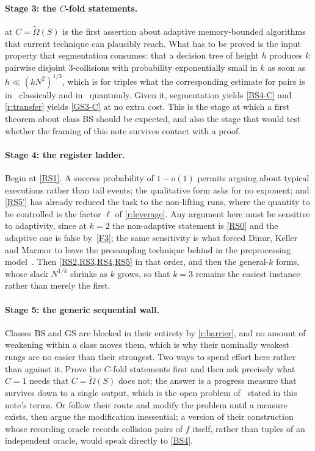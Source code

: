 \documentclass[11pt]{article}
\theoremstyle{plain}
\theoremstyle{definition}
\newcommand{\cls}[1]{\textsf{#1}}   %
\begin{document}
\paragraph{Stage 3: the $C$-fold statements.}
 at $C = \tilde\Omega(S)$ is the first assertion about
adaptive memory-bounded algorithms that current technique can plausibly
reach.  What has to be proved is the input property that segmentation
consumes: that a decision tree of height $h$ produces $k$ pairwise disjoint
$3$-collisions with probability exponentially small in $k$ as soon as
$h \ll (kN^{2})^{1/3}$, which is for triples what the corresponding
estimate for pairs is in~\cite{Din20} classically and in~\cite{HM21}
quantumly.  Given it, segmentation yields
\cref{BS4-C} and \cref{r:transfer} yields \cref{GS3-C} at no extra cost.
This is the stage at which a first theorem about class \cls{BS} should be
expected, and also the stage that would test whether the framing of this
note survives contact with a proof.

\paragraph{Stage 4: the register ladder.}
Begin at \cref{RS1}.  A success probability of $1-o(1)$ permits arguing
about typical executions rather than tail events; the qualitative form asks
for no exponent; and \cref{RS5'} has already reduced the task to the
non-lifting runs, where the quantity to be controlled is the factor $\ell$
of \cref{r:leverage}.  Any argument here must be sensitive to adaptivity,
since at $k=2$ the non-adaptive statement is \cref{RS0} and the adaptive one
is false by~\ref{F3}; the same sensitivity is what forced Dinur, Keller and
Marmor to leave the presampling technique behind in the preprocessing
model~\cite{DKM25}.  Then \cref{RS2,RS3,RS4,RS5} in that order, and then
the general-$k$ forms, whose slack $N^{1/k}$ shrinks as $k$ grows, so that
$k=3$ remains the easiest instance rather than merely the first.

\paragraph{Stage 5: the generic sequential wall.}
Classes \cls{BS} and \cls{GS} are blocked in their entirety by
\cref{r:barrier}, and no amount of weakening within a class moves them,
which is why their nominally weakest rungs are no easier than their
strongest.  Two ways to spend effort here rather than against it.  Prove the
$C$-fold statements first and then ask precisely what $C=1$ needs that
$C = \tilde\Omega(S)$ does not; the answer is a progress measure that
survives down to a single output, which is the open problem of~\cite{HHL26}
stated in this note's terms.  Or follow their route and modify the problem
until a measure exists, then argue the modification inessential; a version
of their construction whose recording oracle records collision pairs of $f$
itself, rather than tuples of an independent oracle, would speak directly
to \cref{BS4}.
\end{document}
